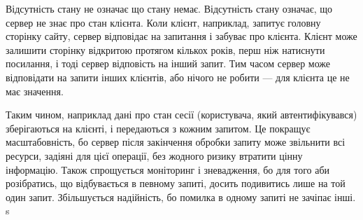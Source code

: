Відсутність стану не означає що стану немає. Відсутність стану означає, що сервер не знає про стан клієнта. Коли клієнт, наприклад, запитує головну сторінку сайту, сервер відповідає на запитання і забуває про клієнта. Клієнт може залишити сторінку відкритою протягом кількох років, перш ніж натиснути посилання, і тоді сервер відповість на інший запит. Тим часом сервер може відповідати на запити інших клієнтів, або нічого не робити — для клієнта це не має значення.

Таким чином, наприклад дані про стан сесії (користувача, який автентифікувався) зберігаються на клієнті, і передаються з кожним запитом. Це покращує масштабовність, бо сервер після закінчення обробки запиту може звільнити всі ресурси, задіяні для цієї операції, без жодного ризику втратити цінну інформацію. Також спрощується моніторинг і зневадження, бо для того аби розібратись, що відбувається в певному запиті, досить подивитись лише на той один запит. Збільшується надійність, бо помилка в одному запиті не зачіпає інші.
s